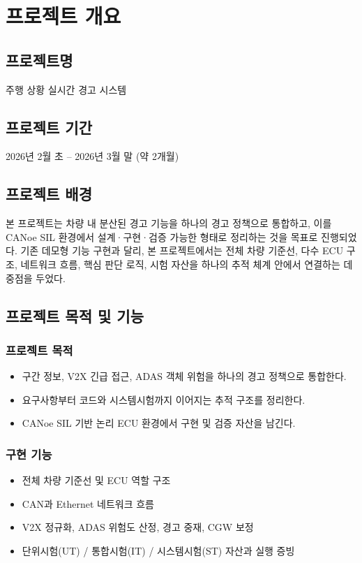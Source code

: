 \documentclass[11pt,a4paper]{article}
\newcommand{\ProjectTitle}{주행 상황 실시간 경고 시스템}
\newcommand{\ProjectPeriod}{2026년 2월 초 -- 2026년 3월 말 (약 2개월)}
\begin{document}
\clearpage
\tableofcontents
\clearpage
\listoftables
\clearpage
\listoffigures
\clearpage

\section{프로젝트 개요}

\subsection{프로젝트명}
\ProjectTitle

\subsection{프로젝트 기간}
\ProjectPeriod

\subsection{프로젝트 배경}
본 프로젝트는 차량 내 분산된 경고 기능을 하나의 경고 정책으로 통합하고, 이를 CANoe SIL 환경에서 설계·구현·검증 가능한 형태로 정리하는 것을 목표로 진행되었다. 기존 데모형 기능 구현과 달리, 본 프로젝트에서는 전체 차량 기준선, 다수 ECU 구조, 네트워크 흐름, 핵심 판단 로직, 시험 자산을 하나의 추적 체계 안에서 연결하는 데 중점을 두었다.

\subsection{프로젝트 목적 및 기능}
\subsubsection{프로젝트 목적}
\begin{itemize}
  \item 구간 정보, V2X 긴급 접근, ADAS 객체 위험을 하나의 경고 정책으로 통합한다.
  \item 요구사항부터 코드와 시스템시험까지 이어지는 추적 구조를 정리한다.
  \item CANoe SIL 기반 논리 ECU 환경에서 구현 및 검증 자산을 남긴다.
\end{itemize}

\subsubsection{구현 기능}
\begin{itemize}
  \item 전체 차량 기준선 및 ECU 역할 구조
  \item CAN과 Ethernet 네트워크 흐름
  \item V2X 정규화, ADAS 위험도 산정, 경고 중재, CGW 보정
  \item 단위시험(UT) / 통합시험(IT) / 시스템시험(ST) 자산과 실행 증빙
\end{itemize}
\end{document}
